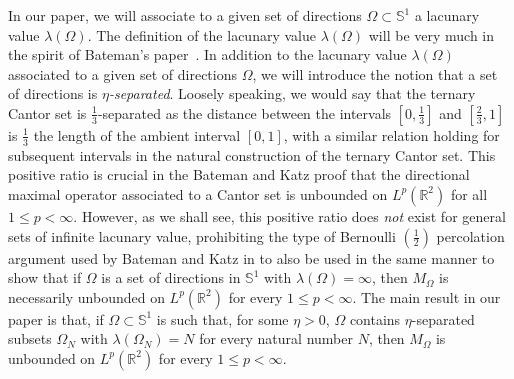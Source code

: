 \documentclass[12pt]{amsart}
\numberwithin{equation}{section}
\def\b#1{{\color{blue}#1}}
\theoremstyle{definition}
\theoremstyle{remark}
\def\b#1{{\color{blue}#1}}
\begin{document}
In our paper, we will associate to a given set of directions $\Omega \subset \mathbb{S}^{1}$ a lacunary value $\lambda(\Omega)$.     The definition of the lacunary value $\lambda(\Omega)$ will be very much in the spirit of Bateman's \mbox{paper \cite{Ba}.}    %
In addition to the lacunary value $\lambda(\Omega)$ associated to a given set of directions $\Omega$, we will introduce the notion that a set of directions is \emph{$\eta$-separated}.   Loosely speaking, we would say that the ternary Cantor set is $\frac{1}{3}$-separated as the distance between the intervals $[0,\frac{1}{3}]$ and $[ \frac{2}{3}, 1]$ is $\frac{1}{3}$ the length of the ambient interval $[0,1]$, with a similar relation holding for subsequent intervals in the natural construction of the ternary Cantor set.  This positive ratio is crucial in the Bateman and Katz proof that the directional maximal operator associated to a Cantor set is unbounded on $L^p(\mathbb{R}^2)$ for all $1 \leq p < \infty$.   However, as we shall see, this positive ratio does \emph{not} exist for general sets of infinite lacunary value, prohibiting the type of Bernoulli $(\frac{1}{2})$ percolation argument used by Bateman and Katz in \cite{KB} to also be used in the same manner to show that if $\Omega$ is a set of directions in $\mathbb{S}^1$ with $\lambda(\Omega) = \infty$, then $M_\Omega$ is necessarily unbounded on $L^p(\mathbb{R}^2)$ for every $1 \leq p < \infty$. The main result in our paper is that, if $\Omega \subset \mathbb{S}^{1}$ is such that, for some $\eta > 0$, $\Omega$ contains $\eta$-separated subsets $\Omega_{N}$ with $\lambda(\Omega_N) = N$ for every natural number $N$, then $M_\Omega$ is unbounded on  
$L^p(\mathbb{R}^2)$ for every $1 \leq p < \infty$.


\end{document}
